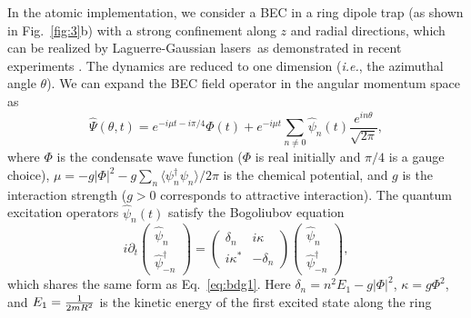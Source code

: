 \documentclass[twocolumn,prl,floatfix,citeautoscript,nofootinbib,superscriptaddress]{revtex4}
\begin{document}
In the atomic implementation, we consider a BEC in a ring dipole trap (as
shown in Fig.~\ref{fig:3}b) with a strong confinement along $z$ and radial
directions, which can be realized by Laguerre-Gaussian lasers~as
demonstrated in recent experiments \cite{PhysRevA.74.023617,nature12958}.
The dynamics are reduced to one dimension (\textit{i.e.}, the azimuthal
angle $\theta $). %
We can expand the BEC field operator in the angular momentum space as~\cite%
{PhysRevB.53.9341,RevModPhys.77.187}
\begin{equation}
\hat{\Psi}(\theta ,t)=e^{-i\mu t-i\pi /4}\Phi (t)+e^{-i\mu t}\sum_{n\neq 0}%
\hat{\psi}_{n}(t)\frac{e^{in\theta }}{\sqrt{2\pi }},  \label{eq:field}
\end{equation}%
where $\Phi $ is the condensate wave function ($\Phi $ is real initially and
$\pi /4$ is a gauge choice), $\mu =-g|\Phi |^{2}-g\sum_{n}\langle \psi
_{n}^{\dag }\psi _{n}\rangle /2\pi $ is the chemical potential, and $g$ is
the interaction strength ($g>0$ corresponds to attractive interaction). The
quantum excitation operators $\hat{\psi}_{n}(t)$ satisfy the Bogoliubov
equation~\cite{SM}
\begin{equation}
i\partial _{t}\left(
\begin{array}{c}
\hat{\psi}_{n} \\
\hat{\psi}_{-n}^{\dag }%
\end{array}%
\right) =\left(
\begin{array}{cc}
\delta _{n} & i\kappa \\
i\kappa ^{\ast } & -\delta _{n}%
\end{array}%
\right) \left(
\begin{array}{c}
\hat{\psi}_{n} \\
\hat{\psi}_{-n}^{\dag }%
\end{array}%
\right) ,  \label{eq:bdg2}
\end{equation}%
which shares the same form as Eq.~\ref{eq:bdg1}. Here $\delta
_{n}=n^{2}E_{1}-{g}|\Phi |^{2}$, $\kappa ={g}\Phi ^{2}$, and $E_{1}=\frac{1}{%
2mR^{2}}$ is the kinetic energy of the first excited state along the ring
\end{document}
